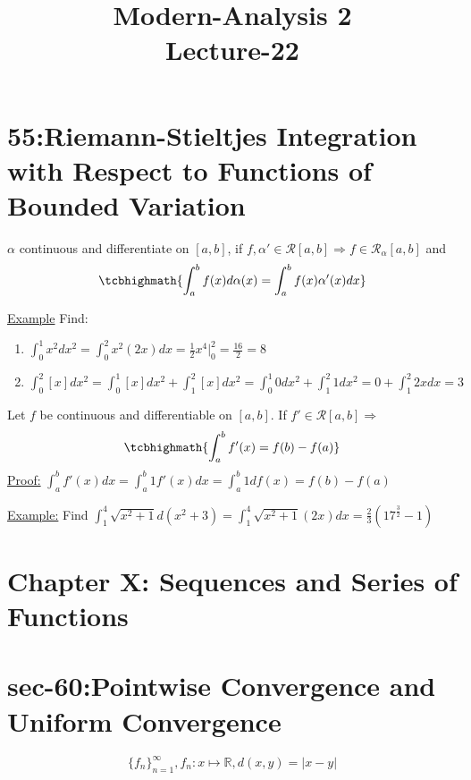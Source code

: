 \documentclass[12pt]{article}
\title{\Huge{Modern-Analysis 2\\Lecture-22}}
\begin{document}
\maketitle
\newpage


\section*{55:Riemann-Stieltjes Integration with Respect to Functions of Bounded Variation}
\begin{tcolorbox}[colback=blue!5!white,colframe=blue!75!black,title=Theorem ]
     $\alpha$ continuous and differentiate on $[a,b]$, if $f,\alpha'\in\mathscr{R}[a,b]\Rightarrow f\in\mathscr{R}_\alpha[a,b]$ and
$$ \tcbhighmath{\int_{a}^{b} f(x)d\alpha(x)=\int_{a}^{b}f(x)\alpha'(x)dx}$$

\end{tcolorbox}

{{\color{blue}\underline {Example}} Find:}
\begin{enumerate}
    \item  $\int_0^1 x^2 d x^2=\int_0^2 x^2(2x)dx=\frac{1}{2}x^4|_0^2=\frac{16}{2}=8$
    \item $\int_0^2 [x]dx^2 =\int_0^1 [x]dx^2+\int_1^2 [x]dx^2=\int_0^1 0dx^2+\int_1^2 1dx^2=0+\int_1^2 2xdx=3$
    \\
\end{enumerate}


\begin{tcolorbox}[colback=blue!5!white,colframe=blue!75!black,title=Corollary "Fundamental theorem"]
   Let $f$ be continuous and differentiable on $[a,b]$. If $f'\in\mathscr{R}[a,b]\Longrightarrow$ 
$$ \tcbhighmath{\int_a^b f'(x)=f(b)-f(a)}$$
{\color{blue}\underline {Proof:}} $\int_a^b f'(x)dx=\int_a^b 1 f'(x) dx=\int_a^b1 df(x)=f(b)-f(a)$
\\
\end{tcolorbox}

{\color{blue}\underline {Example:}} Find $\int_1^4 \sqrt{x^2+1}d(x^2+3)=\int_1^4\sqrt{x^2+1}(2x)dx=\frac{2}{3}(17^{\frac{3}{2}}-1)$ \newpage

\section*{Chapter X: Sequences and Series of Functions}
\section*{\large{sec-60:Pointwise Convergence and Uniform Convergence}}
$$\{f_n\}_{n=1}^\infty,f_n:x\mapsto\mathbb{R},d(x,y)=|x-y|$$
\end{document}
